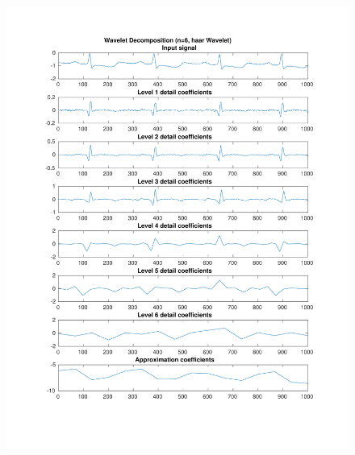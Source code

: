 \documentclass[11pt,a4paper]{article}
\begin{document}
\begin{figure}[H]
\centering
\begin{minipage}{0.48\textwidth}
	\centering
	\includegraphics[width=\textwidth]{fig/112l1_dwt1.pdf}
	

\end{minipage}
\end{figure}
\end{document}
